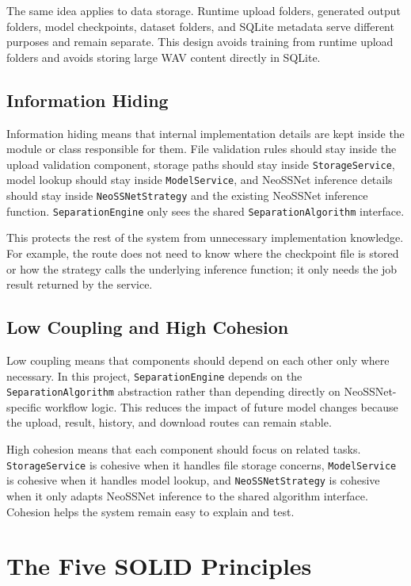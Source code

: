 The same idea applies to data storage. Runtime upload folders, generated output folders, model checkpoints, dataset folders, and SQLite metadata serve different purposes and remain separate. This design avoids training from runtime upload folders and avoids storing large WAV content directly in SQLite.

\subsection{Information Hiding}

Information hiding means that internal implementation details are kept inside the module or class responsible for them. File validation rules should stay inside the upload validation component, storage paths should stay inside \texttt{StorageService}, model lookup should stay inside \texttt{ModelService}, and NeoSSNet inference details should stay inside \texttt{NeoSSNet\allowbreak Strategy} and the existing NeoSSNet inference function. \texttt{SeparationEngine} only sees the shared \texttt{Separation\allowbreak Algorithm} interface.

This protects the rest of the system from unnecessary implementation knowledge. For example, the route does not need to know where the checkpoint file is stored or how the strategy calls the underlying inference function; it only needs the job result returned by the service.

\subsection{Low Coupling and High Cohesion}

Low coupling means that components should depend on each other only where necessary. In this project, \texttt{SeparationEngine} depends on the \texttt{SeparationAlgorithm} abstraction rather than depending directly on NeoSSNet-specific workflow logic. This reduces the impact of future model changes because the upload, result, history, and download routes can remain stable.

High cohesion means that each component should focus on related tasks. \texttt{StorageService} is cohesive when it handles file storage concerns, \texttt{ModelService} is cohesive when it handles model lookup, and \texttt{NeoSSNetStrategy} is cohesive when it only adapts NeoSSNet inference to the shared algorithm interface. Cohesion helps the system remain easy to explain and test.

\section{The Five SOLID Principles}


